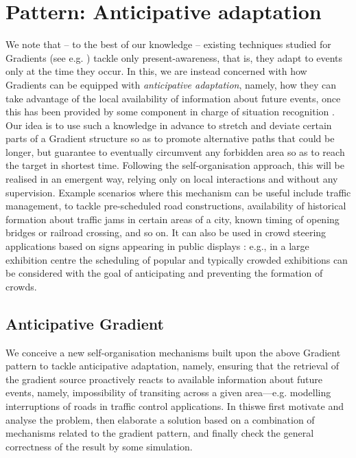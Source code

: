 \documentclass[12pt,a4paper,twoside,openright]{book}
\begin{document}
\chapter{Pattern: Anticipative adaptation}
\label{anticipative-gradient}
We note that -- to the best of our knowledge -- existing techniques studied for Gradients (see e.g. \cite{flexiblegradients,VCMZ-TAAS2011,sapereecolaws-sac2012}) tackle only present-awareness, that is, they adapt to events only at the time they occur.
%
In this\levelText{}, we are instead concerned with how Gradients can be equipped with \emph{anticipative adaptation}, namely, how they can take advantage of the local availability of information about future events, once this has been provided by some component in charge of situation recognition \cite{YeDM12}.
%
Our idea is to use such a knowledge in advance to stretch and deviate certain parts of a Gradient structure so as to promote alternative paths that could be longer, but guarantee to eventually circumvent any forbidden area so as to reach the target in shortest time.
%
Following the self-organisation approach, this will be realised in an emergent way, relying only on local interactions and without any supervision.
%
Example scenarios where this mechanism can be useful include traffic management, to tackle pre-scheduled road constructions, availability of historical formation about traffic jams in certain areas of a city, known timing of opening bridges or railroad crossing, and so on.
%
It can also be used in crowd steering applications based on signs appearing in public displays \cite{sapereecolaws-sac2012}: e.g., in a large exhibition centre the scheduling of popular and typically crowded exhibitions can be considered with the goal of anticipating and preventing the formation of crowds.

\section{Anticipative Gradient}

We conceive a new self-organisation mechanisms built upon the above Gradient pattern to tackle anticipative adaptation, namely, ensuring that the retrieval of the gradient source proactively reacts to available information about future events, namely, impossibility of transiting across a given area---e.g. modelling interruptions of roads in traffic control applications.
%
In this\levelText{}we first motivate and analyse the problem, then elaborate a solution based on a combination of mechanisms related to the gradient pattern, and finally check the general correctness of the result by some simulation.
\end{document}
